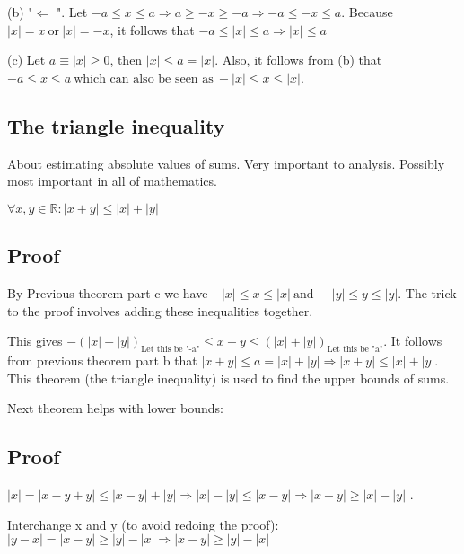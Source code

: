 \documentclass{article}
\begin{document}
(b) "$\Leftarrow$ ". Let $-a \leq x \leq a \Rightarrow a \geq -x \geq -a \Rightarrow -a \leq -x \leq a$. Because  $|x| = x \ \text{or} \ |x| = -x$, it follows that $-a \leq |x| \leq a \Rightarrow |x| \leq a$ 

(c) Let $a \equiv |x| \geq 0$, then $|x| \leq a = |x|$. Also, it follows from (b) that $-a \leq x \leq a \ \text{which can also be seen as} \ -|x| \leq x \leq |x|$.

\subsection{The triangle inequality}

About estimating absolute values of sums. Very important to analysis. Possibly most important in all of mathematics.

$\forall x, y \in \mathbb{R}: |x + y| \leq |x| + |y|$ 

\subsection{Proof}

By Previous theorem part c we have $-|x| \leq x \leq |x| \ \text{and} \ -|y| \leq y \leq |y|$. The trick to the proof involves adding these inequalities together.

This gives $-(|x| + |y|)_{\text{Let this be "-a"}} \leq x + y \leq (|x| + |y|)_{\text{Let this be "a"}}$. It follows from previous theorem part b that  $|x + y| \leq a = |x| + |y| \Rightarrow |x + y| \leq |x| + |y|$. This theorem (the triangle inequality) is used to find the upper bounds of sums.

Next theorem helps with lower bounds:


\subsection{Proof}

$|x| = |x - y + y| \leq |x - y| + |y| \Rightarrow |x| - |y| \leq |x - y| \Rightarrow |x - y| \geq |x| - |y|$ .

Interchange x and y (to avoid redoing the proof):
$|y - x| = |x - y| \geq |y| - |x| \Rightarrow |x - y| \geq |y| - |x|$
\end{document}
